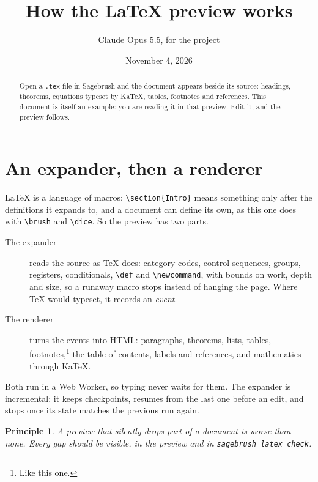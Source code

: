 \documentclass[11pt]{article}
\title{How the \LaTeX{} preview works}
\author{Claude Opus 5.5, for the \brush{} project}
\date{November 4, 2026}
\newtheorem{principle}{Principle}
\newcommand{\brush}{Sagebrush}
\newcommand{\dice}{\operatorname{Dice}}
\begin{document}
\maketitle

\begin{abstract}
Open a \texttt{.tex} file in \brush{} and the document appears beside its source:
headings, theorems, equations typeset by KaTeX, tables, footnotes and references.
This document is itself an example: you are reading it in that preview. Edit it,
and the preview follows.
\end{abstract}

\tableofcontents

\section{An expander, then a renderer}\label{sec:parts}

\LaTeX{} is a language of macros: \verb|\section{Intro}| means something only after
the definitions it expands to, and a document can define its own, as this one
does with \verb|\brush| and \verb|\dice|. So the preview has two parts.

\begin{description}
  \item[The expander] reads the source as \TeX{} does: category codes, control
    sequences, groups, registers, conditionals, \verb|\def| and
    \verb|\newcommand|, with bounds on work, depth and size, so a runaway macro
    stops instead of hanging the page. Where \TeX{} would typeset, it records an
    \emph{event}.
  \item[The renderer] turns the events into HTML: paragraphs, theorems, lists,
    tables, footnotes,\footnote{Like this one.} the table of contents, labels
    and references, and mathematics through KaTeX.
\end{description}

Both run in a Web Worker, so typing never waits for them. The expander is
incremental: it keeps checkpoints, resumes from the last one before an edit, and
stops once its state matches the previous run again.

\begin{principle}\label{pr:visible}
A preview that silently drops part of a document is worse than none. Every gap
should be visible, in the preview and in \texttt{sagebrush latex check}.
\end{principle}
\end{document}
